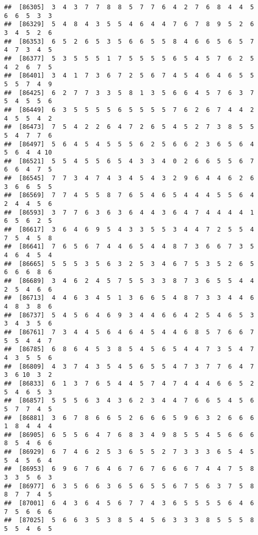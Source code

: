\documentclass[
]{book}
\begin{document}
\begin{verbatim}
##  [86305]  3  4  3  7  7  8  8  5  7  7  6  4  2  7  6  8  4  4  5  6  6  5  3  3
##  [86329]  5  4  8  4  3  5  5  4  6  4  4  7  6  7  8  9  5  2  6  3  4  5  2  6
##  [86353]  6  5  2  6  5  3  5  6  6  5  5  8  4  6  6  5  6  5  7  4  7  3  4  5
##  [86377]  5  3  5  5  5  1  7  5  5  5  5  6  5  4  5  7  6  2  5  4  2  6  7  5
##  [86401]  3  4  1  7  3  6  7  2  5  6  7  4  5  4  6  4  6  5  5  5  5  7  4  9
##  [86425]  6  2  7  7  3  3  5  8  1  3  5  6  6  4  5  7  6  3  7  5  4  5  5  6
##  [86449]  6  3  5  5  5  5  6  5  5  5  5  7  6  2  6  7  4  4  2  4  5  5  4  2
##  [86473]  7  5  4  2  2  6  4  7  2  6  5  4  5  2  7  3  8  5  5  5  4  7  7  6
##  [86497]  5  6  4  5  4  5  5  5  6  2  5  6  6  2  3  6  5  6  4  5  6  4  4 10
##  [86521]  5  5  4  5  5  6  5  4  3  3  4  0  2  6  6  5  5  6  7  6  6  4  7  5
##  [86545]  7  7  3  4  7  4  3  4  5  4  3  2  9  6  4  4  6  2  6  3  6  6  5  5
##  [86569]  7  7  4  5  5  8  7  6  5  4  6  5  4  4  4  5  5  6  4  2  4  4  5  6
##  [86593]  3  7  7  6  3  6  3  6  4  4  3  6  4  7  4  4  4  4  1  6  5  6  2  5
##  [86617]  3  6  4  6  9  5  4  3  3  5  5  3  4  4  7  2  5  5  4  7  5  4  5  8
##  [86641]  7  6  5  6  7  4  4  6  5  4  4  8  7  3  6  6  7  3  5  4  6  4  5  4
##  [86665]  5  5  5  3  5  6  3  2  5  3  4  6  7  5  3  5  2  6  5  6  6  6  8  6
##  [86689]  3  4  6  2  4  5  7  5  5  3  3  8  7  3  6  5  5  4  4  2  5  4  6  6
##  [86713]  4  4  6  3  4  5  1  3  6  6  5  4  8  7  3  3  4  4  6  4  8  3  8  6
##  [86737]  5  4  5  6  4  6  9  3  4  4  6  6  4  2  5  4  6  5  3  3  4  3  5  6
##  [86761]  7  3  4  4  5  6  4  6  4  5  4  4  6  8  5  7  6  6  7  5  5  4  4  7
##  [86785]  6  8  6  4  5  3  8  5  4  5  6  5  4  4  7  3  5  4  7  4  3  5  5  6
##  [86809]  4  3  7  4  3  5  4  5  6  5  5  4  7  3  7  7  6  4  7  3  6 10  3  2
##  [86833]  6  1  3  7  6  5  4  4  5  7  4  7  4  4  4  6  6  5  2  5  4  6  5  3
##  [86857]  5  5  5  6  3  4  3  6  2  3  4  4  7  6  6  5  4  5  6  5  7  7  4  5
##  [86881]  3  6  7  8  6  6  5  2  6  6  6  5  9  6  3  2  6  6  6  1  8  4  4  4
##  [86905]  6  5  5  6  4  7  6  8  3  4  9  8  5  5  4  5  6  6  6  8  5  4  6  6
##  [86929]  6  7  4  6  2  5  3  6  5  5  2  7  3  3  3  6  5  4  5  5  4  5  6  4
##  [86953]  6  9  6  7  6  4  6  7  6  7  6  6  6  7  4  4  7  5  8  3  3  5  6  3
##  [86977]  6  3  5  6  6  3  6  5  6  5  5  6  7  5  6  3  7  5  8  8  7  7  4  5
##  [87001]  6  4  3  6  4  5  6  7  7  4  3  6  5  5  5  5  6  4  6  7  5  6  6  6
##  [87025]  5  6  6  3  5  3  8  5  4  5  6  3  3  3  8  5  5  5  8  5  5  4  6  5

\end{verbatim}
\end{document}

